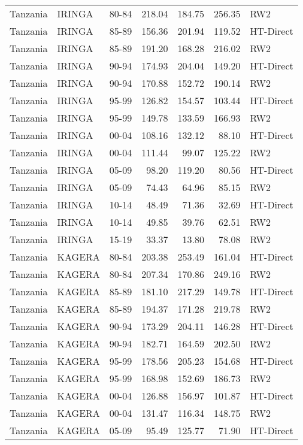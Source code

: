 \begin{longtable}{lllrrrl}
  Tanzania & IRINGA & 80-84 & 218.04 & 184.75 & 256.35 & RW2 \\ 
  Tanzania & IRINGA & 85-89 & 156.36 & 201.94 & 119.52 & HT-Direct \\ 
  Tanzania & IRINGA & 85-89 & 191.20 & 168.28 & 216.02 & RW2 \\ 
  Tanzania & IRINGA & 90-94 & 174.93 & 204.04 & 149.20 & HT-Direct \\ 
  Tanzania & IRINGA & 90-94 & 170.88 & 152.72 & 190.14 & RW2 \\ 
  Tanzania & IRINGA & 95-99 & 126.82 & 154.57 & 103.44 & HT-Direct \\ 
  Tanzania & IRINGA & 95-99 & 149.78 & 133.59 & 166.93 & RW2 \\ 
  Tanzania & IRINGA & 00-04 & 108.16 & 132.12 & 88.10 & HT-Direct \\ 
  Tanzania & IRINGA & 00-04 & 111.44 & 99.07 & 125.22 & RW2 \\ 
  Tanzania & IRINGA & 05-09 & 98.20 & 119.20 & 80.56 & HT-Direct \\ 
  Tanzania & IRINGA & 05-09 & 74.43 & 64.96 & 85.15 & RW2 \\ 
  Tanzania & IRINGA & 10-14 & 48.49 & 71.36 & 32.69 & HT-Direct \\ 
  Tanzania & IRINGA & 10-14 & 49.85 & 39.76 & 62.51 & RW2 \\ 
  Tanzania & IRINGA & 15-19 & 33.37 & 13.80 & 78.08 & RW2 \\ 
  Tanzania & KAGERA & 80-84 & 203.38 & 253.49 & 161.04 & HT-Direct \\ 
  Tanzania & KAGERA & 80-84 & 207.34 & 170.86 & 249.16 & RW2 \\ 
  Tanzania & KAGERA & 85-89 & 181.10 & 217.29 & 149.78 & HT-Direct \\ 
  Tanzania & KAGERA & 85-89 & 194.37 & 171.28 & 219.78 & RW2 \\ 
  Tanzania & KAGERA & 90-94 & 173.29 & 204.11 & 146.28 & HT-Direct \\ 
  Tanzania & KAGERA & 90-94 & 182.71 & 164.59 & 202.50 & RW2 \\ 
  Tanzania & KAGERA & 95-99 & 178.56 & 205.23 & 154.68 & HT-Direct \\ 
  Tanzania & KAGERA & 95-99 & 168.98 & 152.69 & 186.73 & RW2 \\ 
  Tanzania & KAGERA & 00-04 & 126.88 & 156.97 & 101.87 & HT-Direct \\ 
  Tanzania & KAGERA & 00-04 & 131.47 & 116.34 & 148.75 & RW2 \\ 
  Tanzania & KAGERA & 05-09 & 95.49 & 125.77 & 71.90 & HT-Direct \\ 

\end{longtable}
